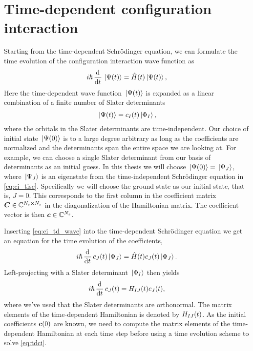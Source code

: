     \section{Time-dependent configuration interaction}
        Starting from the time-dependent Schrödinger equation, we can formulate
        the time evolution of the configuration interaction wave function as
        \begin{align}
            i\hslash \dod[]{}{t}\ket*{\Psi(t)}
            = \hamil(t)\ket*{\Psi(t)},
            \label{eq:ci_tdse}
        \end{align}
        Here the time-dependent wave function $\ket*{\Psi(t)}$ is expanded as a
        linear combination of a finite number of Slater determinants
        \begin{align}
            \ket*{\Psi(t)} = c_{I}(t) \ket*{\Phi_I},
            \label{eq:ci_td_wave}
        \end{align}
        where the orbitals in the Slater determinants are time-independent.
        Our choice of initial state $\ket*{\Psi(0)}$ is to a large degree
        arbitrary as long as the coefficients are normalized and the
        determinants span the entire space we are looking at.
        For example, we can choose a single Slater determinant from our basis of
        determinants as an initial guess.
        In this thesis we will choose $\ket*{\Psi(0)} = \ket*{\Psi_J}$, where
        $\ket*{\Psi_J}$ is an eigenstate from the time-independent Schrödinger
        equation in \autoref{eq:ci_tise}.
        Specifically we will choose the ground state as our initial state, that
        is, $J = 0$.
        This corresponds to the first column in the coefficient matrix
        $\boldsymbol{C} \in \mathbb{C}^{N_s \times N_s}$ in the diagonalization of the
        Hamiltonian matrix.
        The coefficient vector is then $\boldsymbol{c} \in \mathbb{C}^{N_s}$.

        Inserting \autoref{eq:ci_td_wave} into the time-dependent Schrödinger
        equation we get an equation for the time evolution of the coefficients,
        \begin{align}
            i\hslash \dod[]{}{t}c_{J}(t)\ket*{\slat_J}
            = \hamil(t) c_{J}(t)\ket*{\slat_J}.
        \end{align}
        Left-projecting with a Slater determinant $\ket*{\Phi_I}$ then yields
        \begin{gather}
            i\hslash \dod[]{}{t}c_{J}(t)
            = \hamilten_{IJ}(t) c_{J}(t),
            \label{eq:tdci}
        \end{gather}
        where we've used that the Slater determinants are orthonormal.
        The matrix elements of the time-dependent Hamiltonian is denoted by
        $H_{IJ}(t)$.
        As the initial coefficients $\boldsymbol{c}(0)$ are known, we need to compute
        the matrix elements of the time-dependent Hamiltonian at each time step
        before using a time evolution scheme to solve \autoref{eq:tdci}.

\clearemptydoublepage
